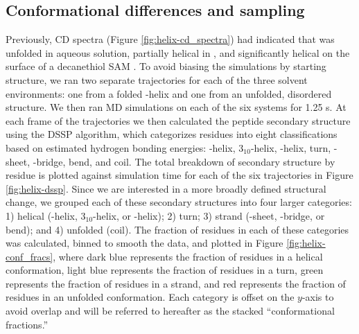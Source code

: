 \subsection{Conformational differences and sampling}

Previously, CD spectra (Figure \ref{fig:helix-cd_spectra}) had indicated that \pep{} was unfolded in aqueous solution, partially helical in \tbawat{}, and significantly helical on the surface of a decanethiol SAM \cite{Gallardo2012}. 
To avoid biasing the simulations by starting structure, we ran two separate trajectories for each of the three solvent environments: one from a folded \textalpha{}-helix and one from an unfolded, disordered structure. 
We then ran MD simulations on each of the six systems for 1.25 \textmu{}s. 
At each frame of the trajectories we then calculated the peptide secondary structure using the DSSP algorithm\cite{Kabsch1983, Joosten2011}, which categorizes residues into eight classifications based on estimated hydrogen bonding energies: \textalpha{}-helix, $3_{10}$-helix, \textpi{}-helix, turn, \textbeta{}-sheet, \textbeta{}-bridge, bend, and coil. 
The total breakdown of secondary structure by residue is plotted against simulation time for each of the six trajectories in Figure \ref{fig:helix-dssp}. 
Since we are interested in a more broadly defined structural change, we grouped each of these secondary structures into four larger categories: 1) helical (\textalpha{}-helix, $3_{10}$-helix, or \textpi{}-helix); 2) turn; 3) strand (\textbeta{}-sheet, \textbeta{}-bridge, or bend); and 4) unfolded (coil). 
The fraction of residues in each of these categories was calculated, binned to smooth the data, and plotted in Figure \ref{fig:helix-conf_fracs}, where dark blue represents the fraction of residues in a helical conformation, light blue represents the fraction of residues in a turn, green represents the fraction of residues in a strand, and red represents the fraction of residues in an unfolded conformation. 
Each category is offset on the $y$-axis to avoid overlap and will be referred to hereafter as the stacked ``conformational fractions.'' 

